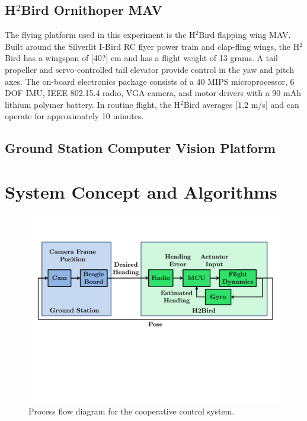 \documentclass{aamas2013}
\begin{document}
\subsection{H$^2$Bird Ornithoper MAV}
The flying platform used in this experiment is the H$^2$Bird flapping wing 
MAV. Built around the Silverlit I-Bird RC flyer power train and clap-fling 
wings, the H$^2$Bird has a wingspan of [40?] cm and has a flight weight of 
13 grams. A tail propeller and servo-controlled tail elevator provide 
control in the yaw and pitch axes. The on-board electronics package consists of 
a 40 MIPS microprocessor, 6 DOF IMU, IEEE 802.15.4 radio, VGA camera, and motor 
drivers with a 90 mAh lithium polymer battery. In routine flight, the H$^2$Bird 
averages [1.2 m/s] and can operate for approximately 10 minutes.


\subsection{Ground Station Computer Vision Platform}


\section{System Concept and Algorithms}

\begin{figure}[tb]
\centering
\includegraphics[width=\linewidth]{figures/process_flow.pdf}
\caption{Process flow diagram for the cooperative control system.}
\label{fig:process_flow}
\end{figure}
\end{document}
